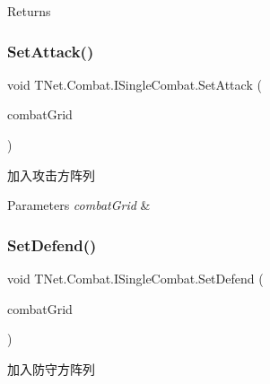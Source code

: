 \begin{DoxyReturn}{Returns}

\end{DoxyReturn}
\mbox{\label{interface_t_net_1_1_combat_1_1_i_single_combat_a02e8c6b12a64e732bed4c7bcf98eae0b}} 
\subsubsection{\texorpdfstring{Set\+Attack()}{SetAttack()}}
{\footnotesize\ttfamily void T\+Net.\+Combat.\+I\+Single\+Combat.\+Set\+Attack (\begin{DoxyParamCaption}\item[{\mbox{\hyperlink{class_t_net_1_1_model_1_1_embattle_queue}{Embattle\+Queue}}}]{combat\+Grid }\end{DoxyParamCaption})}



加入攻击方阵列 


\begin{DoxyParams}{Parameters}
{\em combat\+Grid} & \\
\hline
\end{DoxyParams}
\mbox{\label{interface_t_net_1_1_combat_1_1_i_single_combat_a6e2dcd2a555712742c45e4b3808a25df}} 
\subsubsection{\texorpdfstring{Set\+Defend()}{SetDefend()}}
{\footnotesize\ttfamily void T\+Net.\+Combat.\+I\+Single\+Combat.\+Set\+Defend (\begin{DoxyParamCaption}\item[{\mbox{\hyperlink{class_t_net_1_1_model_1_1_embattle_queue}{Embattle\+Queue}}}]{combat\+Grid }\end{DoxyParamCaption})}



加入防守方阵列 


